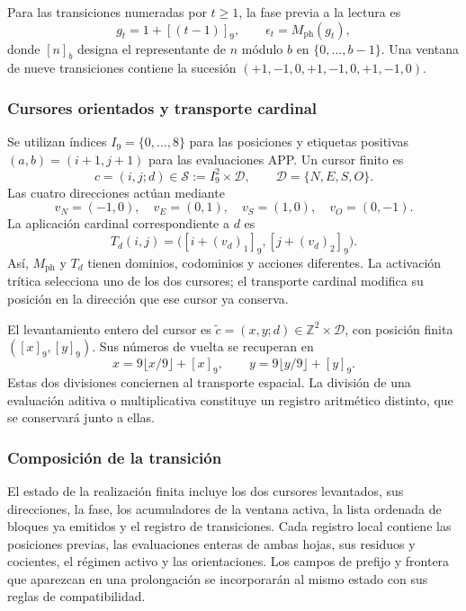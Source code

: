 Para las transiciones numeradas por \(t\geq1\), la fase previa a la lectura es
\begin{equation}
 g_t=1+[(t-1)]_9,\qquad \epsilon_t=M_{\mathrm{ph}}(g_t),
 \label{tpk:fase}
\end{equation}
donde \([n]_b\) designa el representante de \(n\) módulo \(b\) en
\(\{0,\ldots,b-1\}\). Una ventana de nueve transiciones contiene la sucesión
\((+1,-1,0,+1,-1,0,+1,-1,0)\).

\subsubsection{Cursores orientados y transporte cardinal}

Se utilizan índices \(I_9=\{0,\ldots,8\}\) para las posiciones y etiquetas
positivas \((a,b)=(i+1,j+1)\) para las evaluaciones APP. Un cursor finito es
\[
 c=(i,j;d)\in\mathcal S:=I_9^2\times\mathcal D,
 \qquad \mathcal D=\{N,E,S,O\}.
\]
Las cuatro direcciones actúan mediante
\[
 v_N=(-1,0),\quad v_E=(0,1),\quad
 v_S=(1,0),\quad v_O=(0,-1).
\]
La aplicación cardinal correspondiente a \(d\) es
\[
 T_d(i,j)=\bigl([i+(v_d)_1]_9,[j+(v_d)_2]_9\bigr).
\]
Así, \(M_{\mathrm{ph}}\) y \(T_d\) tienen dominios, codominios y acciones
diferentes. La activación trítica selecciona uno de los dos cursores;
el transporte cardinal modifica su posición en la dirección que ese cursor
ya conserva.

El levantamiento entero del cursor es
\(\widetilde c=(x,y;d)\in\mathbb Z^2\times\mathcal D\), con posición finita
\(([x]_9,[y]_9)\). Sus números de vuelta se recuperan en
\begin{equation}
 x=9\lfloor x/9\rfloor+[x]_9,\qquad
 y=9\lfloor y/9\rfloor+[y]_9.
 \label{tpk:vueltas}
\end{equation}
Estas dos divisiones conciernen al transporte espacial. La división de una
evaluación aditiva o multiplicativa constituye un registro aritmético
distinto, que se conservará junto a ellas.

\subsubsection{Composición de la transición}

El estado de la realización finita incluye los dos cursores levantados,
sus direcciones, la fase, los acumuladores de la ventana activa, la lista
ordenada de bloques ya emitidos y el registro de transiciones. Cada registro
local contiene las posiciones previas, las evaluaciones enteras de ambas
hojas, sus residuos y cocientes, el régimen activo y las orientaciones.
Los campos de prefijo y frontera que aparezcan en una prolongación se
incorporarán al mismo estado con sus reglas de compatibilidad.

